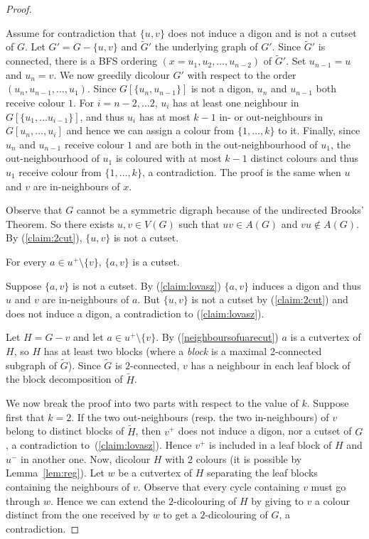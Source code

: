 \begin{proof}
\begin{proofclaim}
Assume for contradiction that $\{u, v\}$ does not induce a digon and is not a cutset of $G$. 
Let $G' = G - \{u, v\}$ and $\tilde{G}'$  the underlying graph of $G'$. Since $\tilde{G}'$ is connected, there is a BFS ordering $(x = u_{1}, u_{2}, \dots, u_{n-2})$ of $\tilde{G}'$. Set $u_{n-1} = u$ and $u_{n} = v$. 
We now greedily dicolour $G'$ with respect to the order $(u_n, u_{n-1}, \dots, u_1)$.  Since $G[\{u_{n}, u_{n-1}\}]$ is not a digon, $u_{n}$ and  $u_{n-1}$ both receive colour $1$. For $i=n-2, \dots 2$, $u_i$ has at least one neighbour in $G[\{u_1, \dots u_{i-1}\}]$, and thus $u_i$ has at most $k-1$ in- or out-neighbours in $G[u_n, \dots, u_i]$ and hence we can assign a colour from $\{1, \dots, k\}$ to it.  
Finally, since $u_n$ and $u_{n-1}$ receive colour $1$ and are both in the out-neighbourhood of $u_1$, the out-neighbourhood of $u_1$ is coloured with at most $k-1$ distinct colours and thus $u_1$ receive colour from $\{1, \dots, k\}$, a contradiction. 
The proof is the same when $u$ and $v$ are in-neighbours of $x$.
\end{proofclaim}
\medskip

Observe that $G$ cannot be a symmetric digraph because of the undirected Brooks' Theorem. So there exists $u, v \in V(G)$ such that $uv \in A(G)$ and $vu \notin A(G)$. 
By (\ref{claim:2cut}), $\{u, v\}$ is not a cutset.

\begin{claim}\label{neighboursofuarecut}
For every $a \in u^+ \setminus \{v\}$, $\{a, v\}$ is a cutset. 
\end{claim}

\begin{proofclaim}
Suppose $\{a, v\}$ is not a cutset. By (\ref{claim:lovasz}) $\{a,v\}$ induces a digon and thus $u$ and $v$ are in-neighbours of $a$. But $\{u,v\}$ is not a cutset by (\ref{claim:2cut}) and does not induce a digon, a contradiction to (\ref{claim:lovasz}).
\end{proofclaim}
\medskip

Let $H = G - v$ and let $a \in u^+ \setminus \{v\}$. 
By (\ref{neighboursofuarecut}) $a$ is a cutvertex of $H$, so $H$ has at least two blocks (where a \textit{block} is a maximal 2-connected subgraph of $\tilde G$).
Since $\tilde G$ is $2$-connected, $v$ has a neighbour in each leaf block of the block decomposition of $\tilde H$. 

We now break the proof into two parts with respect to the value of $k$. 
Suppose first that $k = 2$. 
If the two out-neighbours (resp. the two in-neighbours) of $v$ belong to distinct blocks of $\tilde H$, then $v^+$ does not induce a digon, nor a cutset of $G$, a contradiction to~(\ref{claim:lovasz}). 
Hence $v^+$ is included in a leaf block of $H$ and  $u^{-}$ in another one.
Now, dicolour $H$ with $2$ colours (it is possible by Lemma~\ref{lem:reg}). 
Let $w$ be a cutvertex of $H$ separating the leaf blocks containing the neighbours of $v$. Observe that every cycle containing $v$ must go through $w$. Hence we can extend the $2$-dicolouring of $H$ by giving to $v$ a colour distinct from the one received by $w$  to get a $2$-dicolouring of $G$, a contradiction.


\end{proof}
